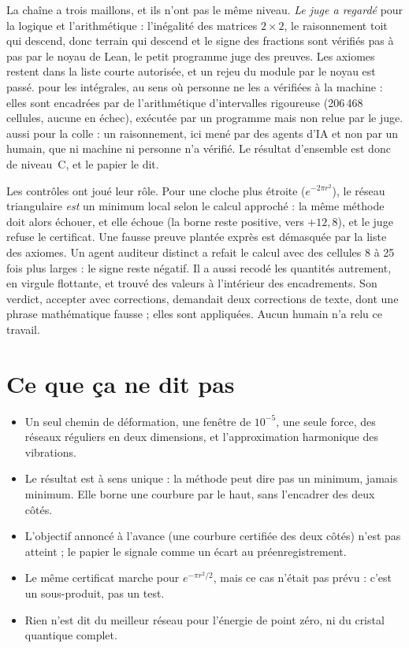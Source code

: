 La chaîne a trois maillons, et ils n'ont pas le même niveau.
 \emph{Le juge a regardé} pour la logique et l'arithmétique : l'inégalité des matrices $2\times2$, le
raisonnement \og toit qui descend, donc terrain qui descend\fg{} et le signe des fractions sont
vérifiés pas à pas par le noyau de Lean, le petit programme juge des preuves. Les axiomes
restent dans la liste courte autorisée, et un rejeu du module par le noyau est passé.
 pour les intégrales, au sens où personne ne les a vérifiées à la machine : elles sont encadrées par de l'arithmétique d'intervalles
rigoureuse (206\,468 cellules, aucune en échec), exécutée par un programme mais non relue par
le juge.  aussi pour la \og colle\fg{} : un raisonnement, ici mené par des agents
d'IA et non par un humain, que ni machine ni personne n'a vérifié. Le résultat d'ensemble est donc de niveau~C, et
le papier le dit.

Les contrôles ont joué leur rôle. Pour une cloche plus étroite ($e^{-2\pi r^2}$), le réseau
triangulaire \emph{est} un minimum local selon le calcul approché : la même méthode doit alors
échouer, et elle échoue (la borne reste positive, vers $+12{,}8$), et le juge refuse le
certificat. Une fausse preuve plantée exprès est démasquée par la liste des axiomes. Un agent
auditeur distinct a refait le calcul avec des cellules 8 à 25 fois plus larges : le signe
reste négatif. Il a aussi recodé les quantités autrement, en virgule flottante, et trouvé des
valeurs à l'intérieur des encadrements. Son verdict, \og accepter avec corrections\fg{},
demandait deux corrections de texte, dont une phrase mathématique fausse ; elles sont
appliquées. Aucun humain n'a relu ce travail.

\section*{Ce que ça ne dit pas}

\begin{limite}
\begin{itemize}
\item Un seul chemin de déformation, une fenêtre de $10^{-5}$, une seule force, des réseaux
  réguliers en deux dimensions, et l'approximation \og harmonique\fg{} des vibrations.
\item Le résultat est à sens unique : la méthode peut dire \og pas un minimum\fg{}, jamais
  \og minimum\fg{}. Elle borne une courbure par le haut, sans l'encadrer des deux côtés.
\item L'objectif annoncé à l'avance (une courbure certifiée des deux côtés) n'est pas
  atteint ; le papier le signale comme un écart au préenregistrement.
\item Le même certificat marche pour $e^{-\pi r^2/2}$, mais ce cas n'était pas prévu : c'est
  un sous-produit, pas un test.
\item Rien n'est dit du meilleur réseau pour l'énergie de point zéro, ni du cristal quantique
  complet.
\end{itemize}
\end{limite}

